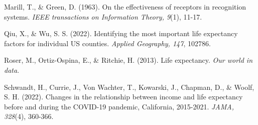 \documentclass[a4paper,12pt]{article}
\begin{document}
\begin{flushleft}
Marill, T., \& Green, D. (1963). On the effectiveness of receptors in recognition systems. \textit{IEEE transactions on Information Theory, 9}(1), 11-17.
\end{flushleft}

\begin{flushleft}
Qiu, X., \& Wu, S. S. (2022). Identifying the most important life expectancy factors for individual US counties. \textit{Applied Geography, 147}, 102786.
\end{flushleft}

\begin{flushleft}
Roser, M., Ortiz-Ospina, E., \& Ritchie, H. (2013). Life expectancy. \textit{Our world in data}.
\end{flushleft}

\begin{flushleft}
Schwandt, H., Currie, J., Von Wachter, T., Kowarski, J., Chapman, D., \& Woolf, S. H. (2022). Changes in the relationship between income and life expectancy before and during the COVID-19 pandemic, California, 2015-2021. \textit{JAMA, 328}(4), 360-366.
\end{flushleft}
\end{document}
